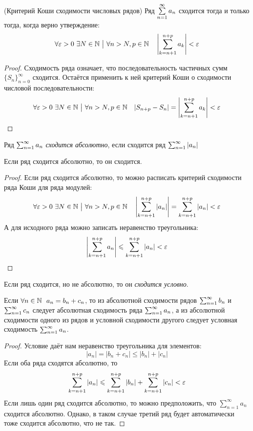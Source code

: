 \begin{theorem} (Критерий Коши сходимости числовых рядов)
	Ряд $\sum\limits_{n = 1}^\infty a_n$ сходится тогда и только тогда, когда верно утверждение:
	\[
		\forall \varepsilon > 0\ \exists N \in \mathbb{N} \ \big|\  \forall n > N, p \in \mathbb{N} \quad \left|\sum\limits_{k = n + 1}^{n + p} a_k\right| < \varepsilon
	\]
\end{theorem}

\begin{proof}
	Сходимость ряда означает, что последовательность частичных сумм $\{S_n\}_{n = 0}^\infty$ сходится. Остаётся применить к ней критерий Коши о сходимости числовой последовательности:
	\[
		\forall \eps > 0\ \exists N \in \N \such \forall n > N, p \in \N \quad |S_{n + p} - S_n| = \left|\suml_{k = n + 1}^{n + p} a_k\right| < \eps
	\]
\end{proof}

\begin{definition}
	Ряд $\sum_{n = 1}^\infty a_n$ \textit{сходится абсолютно}, если сходится ряд $\sum_{n = 1}^\infty |a_n|$
\end{definition}

\begin{theorem}
	Если ряд сходится абсолютно, то он сходится.
\end{theorem}

\begin{proof}
	Если ряд сходится абсолютно, то можно расписать критерий сходимости ряда Коши для ряда модулей:
	\[
		\forall \varepsilon > 0\ \exists N \in \mathbb{N} \ \big|\  \forall n > N, p \in \mathbb{N} \quad \left|\sum\limits_{k = n + 1}^{n + p} |a_n|\right| = \sum\limits_{k = n + 1}^{n + p} |a_n| < \varepsilon
	\]
	А для исходного ряда можно записать неравенство треугольника:
	\[
		\left|\sum\limits_{k = n + 1}^{n + p} a_n\right| \leqslant \sum\limits_{k = n + 1}^{n + p} |a_n| < \varepsilon
	\]
\end{proof}

\begin{definition}
	Если ряд сходится, но не абсолютно, то он \textit{сходится условно}.
\end{definition}

\begin{theorem}
	Если $\forall n \in \mathbb{N}\ \ a_n = b_n + c_n$, то из абсолютной сходимости рядов $\sum_{n = 1}^\infty b_n$ и $\sum_{n = 1}^\infty c_n$ следует абсолютная сходимость ряда $\sum_{n = 1}^\infty a_n$, а из абсолютной сходимости одного из рядов и условной сходимости другого следует условная сходимость $\sum_{n = 1}^\infty a_n$.
\end{theorem}

\begin{proof}
	Условие даёт нам неравенство треугольника для элементов:
	\[
		|a_n| = |b_n + c_n| \le |b_n| + |c_n|
	\]
	Если оба ряда сходятся абсолютно, то
	\[
		\sum\limits_{k = n + 1}^{n + p} |a_n| \leqslant \sum\limits_{k = n + 1}^{n + p} |b_n| + \sum\limits_{k = n + 1}^{n + p} |c_n| < \varepsilon
	\]
	Если лишь один ряд сходится абсолютно, то можно предположить, что $\sum_{n = 1}^{\infty} a_n$ сходится абсолютно. Однако, в таком случае третий ряд будет автоматически тоже сходится абсолютно, что не так.
\end{proof}

